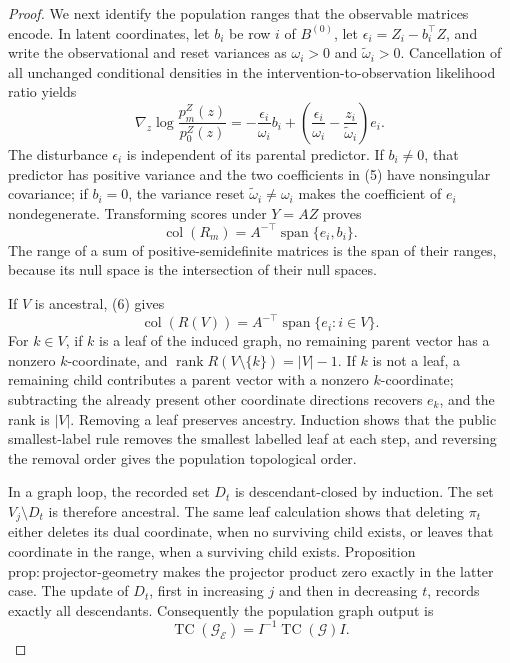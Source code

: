 \documentclass{article}
\begin{document}
\begin{proof}
We next identify the population ranges that the observable matrices encode.  In latent coordinates, let \(b_i\) be row \(i\) of \(B^{(0)}\), let \(\epsilon_i=Z_i-b_i^{\top}Z\), and write the observational and reset variances as \(\omega_i>0\) and \(\widetilde\omega_i>0\).  Cancellation of all unchanged conditional densities in the intervention-to-observation likelihood ratio yields
\[
 \nabla_z\log\frac{p_m^Z(z)}{p_0^Z(z)}
 =-\frac{\epsilon_i}{\omega_i}b_i+
 \left(\frac{\epsilon_i}{\omega_i}-\frac{z_i}{\widetilde\omega_i}\right)e_i.
 \tag{5}
\]
The disturbance \(\epsilon_i\) is independent of its parental predictor.  If \(b_i\ne0\), that predictor has positive variance and the two coefficients in (5) have nonsingular covariance; if \(b_i=0\), the variance reset \(\widetilde\omega_i\ne\omega_i\) makes the coefficient of \(e_i\) nondegenerate.  Transforming scores under \(Y=AZ\) proves
\[
 \operatorname{col}(R_m)=A^{-\top}\operatorname{span}\{e_i,b_i\}.
 \tag{6}
\]
The range of a sum of positive-semidefinite matrices is the span of their ranges, because its null space is the intersection of their null spaces.

If \(V\) is ancestral, (6) gives
\[
 \operatorname{col}(R(V))=A^{-\top}\operatorname{span}\{e_i:i\in V\}.
 \tag{7}
\]
For \(k\in V\), if \(k\) is a leaf of the induced graph, no remaining parent vector has a nonzero \(k\)-coordinate, and \(\operatorname{rank}R(V\setminus\{k\})=|V|-1\).  If \(k\) is not a leaf, a remaining child contributes a parent vector with a nonzero \(k\)-coordinate; subtracting the already present other coordinate directions recovers \(e_k\), and the rank is \(|V|\).  Removing a leaf preserves ancestry.  Induction shows that the public smallest-label rule removes the smallest labelled leaf at each step, and reversing the removal order gives the population topological order.

In a graph loop, the recorded set \(D_t\) is descendant-closed by induction.  The set \(V_j\setminus D_t\) is therefore ancestral.  The same leaf calculation shows that deleting \(\pi_t\) either deletes its dual coordinate, when no surviving child exists, or leaves that coordinate in the range, when a surviving child exists.  Proposition \(\mathrm{prop{:}projector\mbox{-}geometry}\) makes the projector product zero exactly in the latter case.  The update of \(D_t\), first in increasing \(j\) and then in decreasing \(t\), records exactly all descendants.  Consequently the population graph output is
\[
 \operatorname{TC}(\mathcal G_{\mathcal E})
 =I^{-1}\operatorname{TC}(\mathcal G)I.
 \tag{8}
\]


\end{proof}
\end{document}
